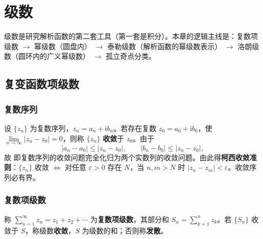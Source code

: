 
\chapter{级数}

级数是研究解析函数的第二套工具（第一套是积分）。本章的逻辑主线是：复数项级数 \(\to\) 幂级数（圆盘内） \(\to\) 泰勒级数（解析函数的幂级数表示） \(\to\) 洛朗级数（圆环内的广义幂级数） \(\to\) 孤立奇点分类。

\section{复变函数项级数}

\subsection{复数序列}
设 \(\{z_{n}\}\) 为复数序列，\(z_{n}=a_{n}+\mathrm{i}b_{n}\)。若存在复数 \(z_{0}=a_{0}+\mathrm{i}b_{0}\)，使 \(\lim\limits_{n\to\infty}|z_{n}-z_{0}|=0\)，则称 \(\{z_{n}\}\) \textbf{收敛}于 \(z_{0}\)。由于
\[
|a_{n}-a_{0}|\leqslant|z_{n}-z_{0}|,\qquad |b_{n}-b_{0}|\leqslant|z_{n}-z_{0}|,
\]
故
即复数序列的收敛问题完全化归为两个实数列的收敛问题。由此得\textbf{柯西收敛准则}：\(\{z_{n}\}\) 收敛 \(\iff\) 对任意 \(\varepsilon>0\) 存在 \(N\)，当 \(n,m>N\) 时 \(|z_{n}-z_{m}|<\varepsilon\)。收敛序列必有界。

\subsection{复数项级数}
称 \(\sum\limits_{n=1}^{\infty}z_{n}=z_{1}+z_{2}+\cdots\) 为\textbf{复数项级数}，其部分和 \(S_{n}=\sum\limits_{k=1}^{n}z_{k}\)。若 \(\{S_{n}\}\) 收敛于 \(S\)，称级数\textbf{收敛}，\(S\) 为级数的和；否则称\textbf{发散}。

